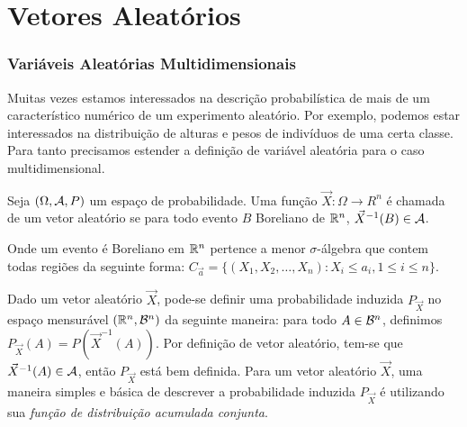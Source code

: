 %
%
%
%
%
%
%
%
\section{Vetores Aleatórios}
\begin{frame}
\frametitle{Variáveis Aleatórias Multidimensionais}

Muitas vezes estamos interessados na descrição probabilística de
mais de um característico numérico de um experimento aleatório. Por
exemplo, podemos estar interessados na distribuição de alturas e
pesos de indivíduos de uma certa classe. Para tanto precisamos
estender a definição de variável aleatória para o caso
multidimensional.

\begin{defi}
Seja $(\Omega,{\cal A},P)$ um espaço de probabilidade. Uma função
$\vec{X}:\Omega \rightarrow R^n$ é chamada de um vetor aleatório se
para todo evento $B$ Boreliano de $\mathbb{R}^n$, $\vec{X}^{-1}(B)\in {\cal A}$.
\end{defi}
\bigskip Onde um evento é Boreliano em $\mathbb{R}^n$ pertence a menor
$\sigma$-álgebra que contem todas regiões da seguinte forma:
$C_{\vec{a}}=\{(X_1,X_2,\ldots,X_n):X_i\leq a_i, 1\leq i\leq n\}$.

\bigskip
Dado um vetor aleatório $\vec{X}$, pode-se definir uma probabilidade
induzida $P_{\vec{X}}$ no espaço mensurável $(\mathbb{R}^n,{\cal B}^n)$ da
seguinte maneira: para todo $A\in {\cal B}^n$, definimos
$P_{\vec{X}}(A)=P(\vec{X}^{-1}(A))$. Por definição de vetor
aleatório, tem-se que $\vec{X}^{-1}(A)\in {\cal A}$, então $P_{\vec{X}}$
está bem definida.
\bigskip 
Para um vetor aleatório $\vec{X}$, uma maneira simples e básica de
descrever a probabilidade induzida $P_{\vec{X}}$ é utilizando sua
{\em função de distribuição acumulada conjunta}.

\end{frame}

